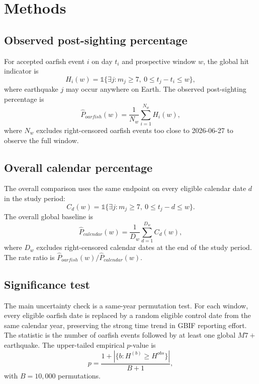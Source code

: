 \documentclass[sigconf,nonacm]{acmart}
\begin{document}
\section{Methods}
\subsection{Observed post-sighting percentage}
For accepted oarfish event $i$ on day $t_i$ and prospective window $w$, the global hit indicator is
\begin{equation}
H_i(w) =
\mathbb{1}\{\exists j: m_j \geq 7,\ 0 \leq t_j - t_i \leq w\},
\end{equation}
where earthquake $j$ may occur anywhere on Earth. The observed post-sighting percentage is
\begin{equation}
\widehat{P}_{oarfish}(w) = \frac{1}{N_w}\sum_{i=1}^{N_w} H_i(w),
\end{equation}
where $N_w$ excludes right-censored oarfish events too close to 2026-06-27 to observe the full window.

\subsection{Overall calendar percentage}
The overall comparison uses the same endpoint on every eligible calendar date $d$ in the study period:
\begin{equation}
C_d(w) =
\mathbb{1}\{\exists j: m_j \geq 7,\ 0 \leq t_j - d \leq w\}.
\end{equation}
The overall global baseline is
\begin{equation}
\widehat{P}_{calendar}(w) = \frac{1}{D_w}\sum_{d=1}^{D_w} C_d(w),
\end{equation}
where $D_w$ excludes right-censored calendar dates at the end of the study period. The rate ratio is $\widehat{P}_{oarfish}(w) / \widehat{P}_{calendar}(w)$.

\subsection{Significance test}
The main uncertainty check is a same-year permutation test. For each window, every eligible oarfish date is replaced by a random eligible control date from the same calendar year, preserving the strong time trend in GBIF reporting effort. The statistic is the number of oarfish events followed by at least one global $M7+$ earthquake. The upper-tailed empirical $p$-value is
\begin{equation}
p = \frac{1 + |\{b: H^{(b)} \geq H^{obs}\}|}{B + 1},
\end{equation}
with $B=10{,}000$ permutations.
\end{document}
